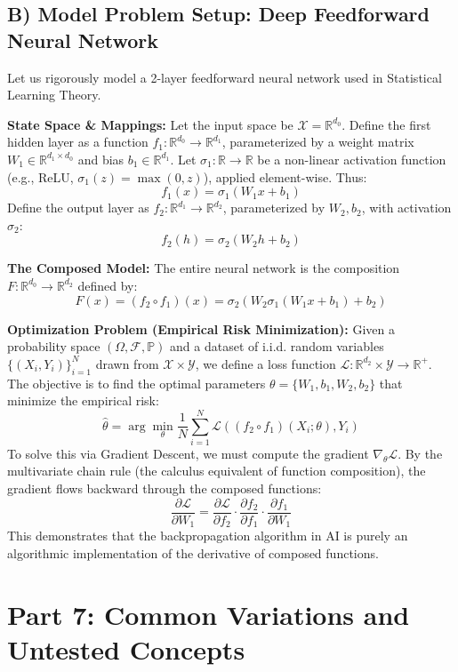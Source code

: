 \documentclass[11pt, a4paper]{article}
\theoremstyle{definition}
\theoremstyle{remark}
\newcommand{\R}{\mathbb{R}}
\newcommand{\Prob}{\mathbb{P}}
\newcommand{\F}{\mathcal{F}}
\begin{document}
\subsection{B) Model Problem Setup: Deep Feedforward Neural Network}
Let us rigorously model a 2-layer feedforward neural network used in Statistical Learning Theory. 

\textbf{State Space \& Mappings:}
Let the input space be $\mathcal{X} = \R^{d_0}$. 
Define the first hidden layer as a function $f_1: \R^{d_0} \to \R^{d_1}$, parameterized by a weight matrix $W_1 \in \R^{d_1 \times d_0}$ and bias $b_1 \in \R^{d_1}$. Let $\sigma_1: \R \to \R$ be a non-linear activation function (e.g., ReLU, $\sigma_1(z) = \max(0, z)$), applied element-wise. Thus:
\[ f_1(x) = \sigma_1(W_1 x + b_1) \]
Define the output layer as $f_2: \R^{d_1} \to \R^{d_2}$, parameterized by $W_2, b_2$, with activation $\sigma_2$:
\[ f_2(h) = \sigma_2(W_2 h + b_2) \]

\textbf{The Composed Model:}
The entire neural network is the composition $F: \R^{d_0} \to \R^{d_2}$ defined by:
\[ F(x) = (f_2 \circ f_1)(x) = \sigma_2(W_2 \sigma_1(W_1 x + b_1) + b_2) \]

\textbf{Optimization Problem (Empirical Risk Minimization):}
Given a probability space $(\Omega, \F, \Prob)$ and a dataset of i.i.d. random variables $\{(X_i, Y_i)\}_{i=1}^N$ drawn from $\mathcal{X} \times \mathcal{Y}$, we define a loss function $\mathcal{L}: \R^{d_2} \times \mathcal{Y} \to \R^+$. The objective is to find the optimal parameters $\theta = \{W_1, b_1, W_2, b_2\}$ that minimize the empirical risk:
\[ \hat{\theta} = \arg\min_{\theta} \frac{1}{N} \sum_{i=1}^N \mathcal{L}((f_2 \circ f_1)(X_i; \theta), Y_i) \]
To solve this via Gradient Descent, we must compute the gradient $\nabla_\theta \mathcal{L}$. By the multivariate chain rule (the calculus equivalent of function composition), the gradient flows backward through the composed functions:
\[ \frac{\partial \mathcal{L}}{\partial W_1} = \frac{\partial \mathcal{L}}{\partial f_2} \cdot \frac{\partial f_2}{\partial f_1} \cdot \frac{\partial f_1}{\partial W_1} \]
This demonstrates that the backpropagation algorithm in AI is purely an algorithmic implementation of the derivative of composed functions.

\section{Part 7: Common Variations and Untested Concepts}
\end{document}
